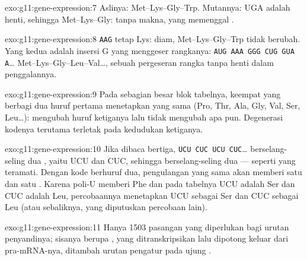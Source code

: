 \begin{solution}{exo:g11:gene-expression:7}
Aslinya: Met--Lys--Gly--Trp. Mutannya: UGA adalah henti, sehingga
Met--Lys--Gly:  tanpa makna, yang memenggal .
\end{solution}

\begin{solution}{exo:g11:gene-expression:8}
\texttt{AAG} tetap Lys: diam, Met--Lys--Gly--Trp tidak berubah. Yang
kedua adalah insersi G yang menggeser rangkanya: \texttt{AUG AAA GGG
CUG GUA A}\dots{} Met--Lys--Gly--Leu--Val\dots, sebuah pergeseran
rangka tanpa henti dalam penggalannya.
\end{solution}

\begin{solution}{exo:g11:gene-expression:9}
Pada sebagian besar blok tabelnya, keempat  yang berbagi dua huruf
pertama menetapkan  yang sama (Pro, Thr, Ala, Gly, Val, Ser,
Leu\dots): mengubah huruf ketiganya lalu tidak mengubah apa pun.
Degenerasi kodenya terutama terletak pada kedudukan ketiganya.
\end{solution}

\begin{solution}{exo:g11:gene-expression:10}
Jika dibaca bertiga, \texttt{UCU CUC UCU CUC}\dots{} berselang-seling
dua , yaitu UCU dan CUC, sehingga  berselang-seling dua
 --- seperti yang teramati. Dengan kode berhuruf dua,
pengulangan yang sama akan memberi satu  dan satu .
Karena poli-U memberi Phe dan pada tabelnya UCU adalah Ser dan CUC
adalah Leu, percobaannya menetapkan UCU sebagai Ser dan CUC sebagai Leu
(atau sebaliknya, yang diputuskan percobaan lain).
\end{solution}

\begin{solution}{exo:g11:gene-expression:11}
Hanya 1503 pasangan  yang diperlukan bagi urutan penyandinya;
sisanya berupa , yang ditranskripsikan lalu dipotong keluar dari
pra-mRNA-nya, ditambah urutan pengatur pada ujung .
\end{solution}

